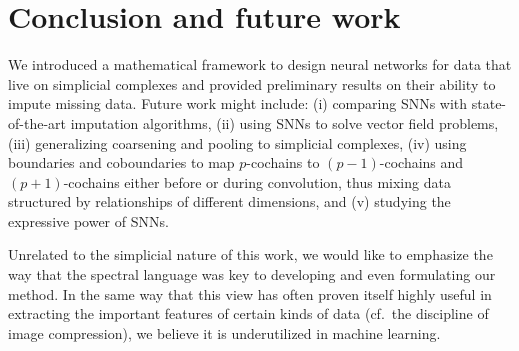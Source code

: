 \section{Conclusion and future work}

We introduced a mathematical framework to design neural networks for data that live on simplicial complexes and provided preliminary results on their ability to impute missing data.
Future work might include: (i) comparing SNNs with state-of-the-art imputation algorithms, (ii) using SNNs to solve vector field problems, (iii) generalizing coarsening and pooling to simplicial complexes, (iv) using boundaries and coboundaries to map $p$-cochains to $(p-1)$-cochains and $(p+1)$-cochains either before or during convolution, thus mixing data structured by relationships of different dimensions, and (v) studying the expressive power of SNNs.

Unrelated to the simplicial nature of this work, we would like to emphasize the way that the spectral language was key to developing and even formulating our method. In the same way that this view has often proven itself highly useful in extracting the important features of certain kinds of data (cf.\ the discipline of image compression), we believe it is underutilized in machine learning.
